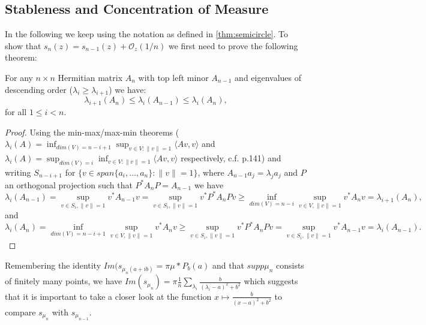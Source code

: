 \subsection{Stableness and Concentration of Measure}
In the following we keep using the notation as defined in \ref{thm:semicircle}. To show that $s_n(z)=s_{n-1}(z)+\mathcal O_z(1/n)$ we first need to prove the following theorem:

\begin{theorem}
	For any $n\times n$ Hermitian matrix $A_n$ with top left minor $A_{n-1}$ and eigenvalues of descending order ($\lambda_i\geq\lambda_{i+1}$) we have:
	\begin{equation*}
		\lambda_{i+1}(A_n)\leq\lambda_i(A_{n-1})\leq\lambda_i(A_n), 
	\end{equation*}
	for all $1\leq i < n$.
\end{theorem}
\begin{proof}
Using the min-max/max-min theorems ($\lambda_i(A)=\inf_{dim(V)=n-i+1}\sup_{v\in V : \|v\|=1}\langle Av,v\rangle$ and $\lambda_i(A)=\sup_{dim(V)=i}\inf_{v\in V : \|v\|=1}\langle Av,v\rangle$ respectively, c.f. \cite{TeschlQM} p.141) and writing $S_{n-i+1}$ for $\{v\in span\{a_i,\dots,a_n\}: \|v\|=1\}$, where $A_{n-1}a_j=\lambda_j a_j$ and $P$ an orthogonal projection such that $P^*A_nP=A_{n-1}$ we have
	\begin{equation*}
		\lambda_i(A_{n-1}) =
		\sup_{v\in S_i,\|v\|=1}v^*A_{n-1}v =
		\sup_{v\in S_i,\|v\|=1}v^*P^*A_nPv \geq
		\inf_{dim(V)=n-i}\sup_{v\in V,\|v\|=1}v^*A_nv =
		\lambda_{i+1}(A_n),
	\end{equation*}
	and
	\begin{equation*}
		\lambda_i(A_n) =
		\inf_{dim(V)=n-i+1}\sup_{v\in V,\|v\|=1}v^*A_nv \geq
		\sup_{v\in S_i,\|v\|=1}v^*P^*A_nPv =
		\sup_{v\in S_i,\|v\|=1}v^*A_{n-1}v =
		\lambda_i(A_{n-1}).%
	\end{equation*}
\end{proof}

Remembering the identity $Im(s_{\mu_n(a+ib)}=\pi\mu*P_b(a)$ and that $supp\mu_n$ consists of finitely many points, we have $Im(s_{\mu_n})=\pi\frac{1}{n}\sum_{\lambda_i}\frac{b}{(\lambda_i-a)^2+b^2}$ which suggests that it is important to take a closer look at the function $x\mapsto\frac{b}{(x-a)^2+b^2}$ to compare $s_{\mu_n}$ with $s_{\mu_{n-1}}$.

